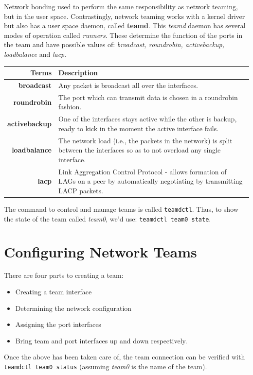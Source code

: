 Network bonding used to perform the same responsibility as network teaming, but in the user space. Contrastingly, network teaming works with a kernel driver but also has a user space daemon, called \textbf{teamd}. This \textit{teamd} daemon has several modes of operation called \textit{runners}. These determine the function of the ports in the team and have possible values of: \textit{broadcast, roundrobin, activebackup, loadbalance} and \textit{lacp}. 

\noindent
\begin{tabular}{rM{0.85}}
	\toprule
	\textbf{Terms} &\textbf{Description} \\
	\midrule
	\textbf{broadcast}	&Any packet is broadcast all over the interfaces.\\
	\midrule
	\textbf{roundrobin}	&The port which can transmit data is chosen in a roundrobin fashion.\\
	\midrule
	\textbf{activebackup}	&One of the interfaces stays active while the other is backup, ready to kick in the moment the active interface fails.\\
	\midrule
	\textbf{loadbalance}	&The network load (i.e., the packets in the network) is split between the interfaces so as to not overload any single interface.\\
	\midrule
	\textbf{lacp}	&Link Aggregation Control Protocol - allows formation of LAGs on a peer by automatically negotiating by transmitting LACP packets.\\
	\bottomrule
\end{tabular}

\noindent
The command to control and manage teams is called \verb|teamdctl|. Thus, to show the state of the team called \textit{team0}, we'd use: \verb|teamdctl team0 state|. 

	\section{Configuring Network Teams}
There are four parts to creating a team:
\begin{itemize}
	\item Creating a team interface
	\item Determining the network configuration
	\item Assigning the port interfaces
	\item Bring team and port interfaces up and down respectively. 
\end{itemize}

\noindent
Once the above has been taken care of, the team connection can be verified with \verb|teamdctl team0 status| (assuming \textit{team0} is the name of the team). 

